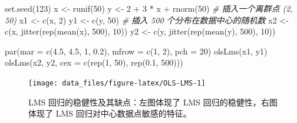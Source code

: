 \documentclass[
  b5paper,
  UTF8,twoside]{book}
\newenvironment{Shaded}{\begin{snugshade}}{\end{snugshade}}
\newcommand{\AttributeTok}[1]{\textcolor[rgb]{0.77,0.63,0.00}{#1}}
\newcommand{\CommentTok}[1]{\textcolor[rgb]{0.56,0.35,0.01}{\textit{#1}}}
\newcommand{\DecValTok}[1]{\textcolor[rgb]{0.00,0.00,0.81}{#1}}
\newcommand{\FloatTok}[1]{\textcolor[rgb]{0.00,0.00,0.81}{#1}}
\newcommand{\FunctionTok}[1]{\textcolor[rgb]{0.00,0.00,0.00}{#1}}
\newcommand{\NormalTok}[1]{#1}
\newcommand{\OtherTok}[1]{\textcolor[rgb]{0.56,0.35,0.01}{#1}}
\newcommand{\SpecialCharTok}[1]{\textcolor[rgb]{0.00,0.00,0.00}{#1}}
\begin{document}
\begin{Shaded}
\begin{Highlighting}[]
\FunctionTok{set.seed}\NormalTok{(}\DecValTok{123}\NormalTok{)}
\NormalTok{x }\OtherTok{\textless{}{-}} \FunctionTok{runif}\NormalTok{(}\DecValTok{50}\NormalTok{)}
\NormalTok{y }\OtherTok{\textless{}{-}} \DecValTok{2} \SpecialCharTok{+} \DecValTok{3} \SpecialCharTok{*}\NormalTok{ x }\SpecialCharTok{+} \FunctionTok{rnorm}\NormalTok{(}\DecValTok{50}\NormalTok{)}
\CommentTok{\# 插入一个离群点 (2, 50)}
\NormalTok{x1 }\OtherTok{\textless{}{-}} \FunctionTok{c}\NormalTok{(x, }\DecValTok{2}\NormalTok{)}
\NormalTok{y1 }\OtherTok{\textless{}{-}} \FunctionTok{c}\NormalTok{(y, }\DecValTok{50}\NormalTok{)}
\CommentTok{\# 插入 500 个分布在数据中心的随机数}
\NormalTok{x2 }\OtherTok{\textless{}{-}} \FunctionTok{c}\NormalTok{(x, }\FunctionTok{jitter}\NormalTok{(}\FunctionTok{rep}\NormalTok{(}\FunctionTok{mean}\NormalTok{(x), }\DecValTok{500}\NormalTok{), }\DecValTok{10}\NormalTok{))}
\NormalTok{y2 }\OtherTok{\textless{}{-}} \FunctionTok{c}\NormalTok{(y, }\FunctionTok{jitter}\NormalTok{(}\FunctionTok{rep}\NormalTok{(}\FunctionTok{mean}\NormalTok{(y), }\DecValTok{500}\NormalTok{), }\DecValTok{10}\NormalTok{))}
\end{Highlighting}
\end{Shaded}

\begin{Shaded}
\begin{Highlighting}[]
\FunctionTok{par}\NormalTok{(}\AttributeTok{mar =} \FunctionTok{c}\NormalTok{(}\FloatTok{4.5}\NormalTok{, }\FloatTok{4.5}\NormalTok{, }\DecValTok{1}\NormalTok{, }\FloatTok{0.2}\NormalTok{), }\AttributeTok{mfrow =} \FunctionTok{c}\NormalTok{(}\DecValTok{1}\NormalTok{, }\DecValTok{2}\NormalTok{), }\AttributeTok{pch =} \DecValTok{20}\NormalTok{)}
\FunctionTok{olsLms}\NormalTok{(x1, y1)}
\FunctionTok{olsLms}\NormalTok{(x2, y2, }\AttributeTok{cex =} \FunctionTok{c}\NormalTok{(}\FunctionTok{rep}\NormalTok{(}\DecValTok{1}\NormalTok{, }\DecValTok{50}\NormalTok{), }\FunctionTok{rep}\NormalTok{(}\FloatTok{0.1}\NormalTok{, }\DecValTok{500}\NormalTok{)))}
\end{Highlighting}
\end{Shaded}

\begin{figure}

{\centering \texttt{[image: data\_files/figure-latex/OLS-LMS-1]} 

}

\caption[LMS 回归的稳健性及其缺点 ]{LMS 回归的稳健性及其缺点：左图体现了 LMS 回归的稳健性，右图体现了 LMS 回归对中心数据点敏感的特征。}\label{fig:OLS-LMS}
\end{figure}
\end{document}
